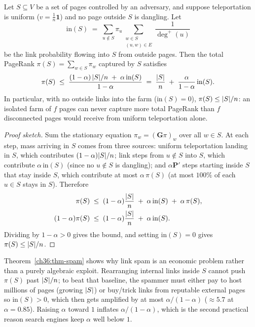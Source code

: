 \begin{theorem}
\label{ch36:thm-spam}
Let $S \subseteq V$ be a set of pages controlled by an adversary, and suppose teleportation is uniform ($v = \tfrac{1}{n}\mathbf{1}$) and no page outside $S$ is dangling. Let
\[
  \mathrm{in}(S) \;=\; \sum_{u \notin S} \pi_u \sum_{\substack{w \in S \\ (u,w) \in E}} \frac{1}{\deg^+(u)}
\]
be the link probability flowing into $S$ from outside pages. Then the total PageRank $\pi(S) = \sum_{w \in S}\pi_w$ captured by $S$ satisfies
\[
  \pi(S) \;\le\; \frac{(1-\alpha)\,\lvert S\rvert/n \;+\; \alpha\,\mathrm{in}(S)}{1-\alpha}
  \;=\; \frac{\lvert S\rvert}{n} \;+\; \frac{\alpha}{1-\alpha}\,\mathrm{in}(S).
\]
In particular, with no outside links into the farm ($\mathrm{in}(S)=0$), $\pi(S) \le \lvert S\rvert/n$: an isolated farm of $f$ pages can never capture more total PageRank than $f$ disconnected pages would receive from uniform teleportation alone.
\end{theorem}

\begin{proof}[Proof sketch]
Sum the stationary equation $\pi_w = (\mathbf{G}\pi)_w$ over all $w \in S$. At each step, mass arriving in $S$ comes from three sources: uniform teleportation landing in $S$, which contributes $(1-\alpha)\lvert S\rvert/n$; link steps from $u \notin S$ into $S$, which contribute $\alpha\,\mathrm{in}(S)$ (since no $u \notin S$ is dangling); and $\alpha\mathbf{P}'$ steps starting inside $S$ that stay inside $S$, which contribute at most $\alpha\,\pi(S)$ (at most $100\%$ of each $u \in S$ stays in $S$). Therefore
\begin{align*}
  \pi(S) &\;\le\; (1-\alpha)\frac{\lvert S\rvert}{n} \;+\; \alpha\,\mathrm{in}(S) \;+\; \alpha\,\pi(S), \\
  (1-\alpha)\pi(S) &\;\le\; (1-\alpha)\frac{\lvert S\rvert}{n} \;+\; \alpha\,\mathrm{in}(S).
\end{align*}
Dividing by $1-\alpha > 0$ gives the bound, and setting $\mathrm{in}(S)=0$ gives $\pi(S) \le \lvert S\rvert/n$.
\end{proof}

\begin{whybox}
Theorem~\ref{ch36:thm-spam} shows why link spam is an economic problem rather than a purely algebraic exploit. Rearranging internal links inside $S$ cannot push $\pi(S)$ past $\lvert S\rvert/n$; to beat that baseline, the spammer must either pay to host millions of pages (growing $\lvert S\rvert$) or buy/trick links from reputable external pages so $\mathrm{in}(S) > 0$, which then gets amplified by at most $\alpha/(1-\alpha)$ ($\approx 5.7$ at $\alpha = 0.85$). Raising $\alpha$ toward $1$ inflates $\alpha/(1-\alpha)$, which is the second practical reason search engines keep $\alpha$ well below $1$.
\end{whybox}

